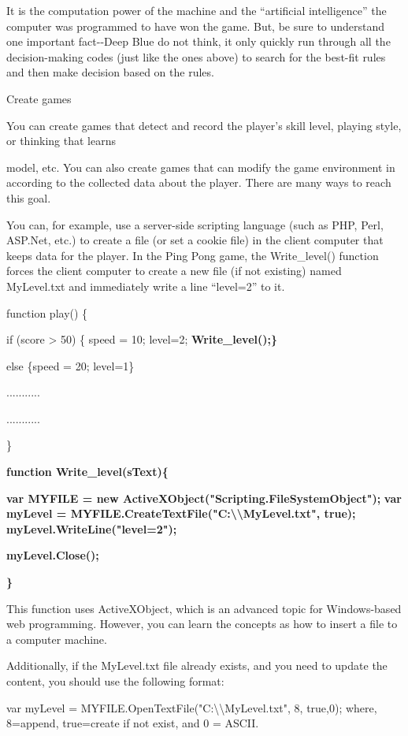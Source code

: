 \documentclass[
]{article}
\begin{document}
It is the computation power of the machine and the ``artificial
intelligence'' the computer was programmed to have won the game. But, be
sure to understand one important fact-\/-Deep Blue do not think, it only
quickly run through all the decision-making codes (just like the ones
above) to search for the best-fit rules and then make decision based on
the rules.

Create games

You can create games that detect and record the player's skill level,
playing style, or thinking that learns

model, etc. You can also create games that can modify the game
environment in according to the collected data about the player. There
are many ways to reach this goal.

You can, for example, use a server-side scripting language (such as PHP,
Perl, ASP.Net, etc.) to create a file (or set a cookie file) in the
client computer that keeps data for the player. In the Ping Pong game,
the Write\_level() function forces the client computer to create a new
file (if not existing) named MyLevel.txt and immediately write a line
``level=2'' to it.

function play() \{

if (score \textgreater{} 50) \{ speed = 10; level=2;
\textbf{Write\_level();\}}

else \{speed = 20; level=1\}

...........

...........

\}

\textbf{function Write\_level(sText)\{}

\textbf{var MYFILE = new ActiveXObject("Scripting.FileSystemObject");}
\textbf{var myLevel =
MYFILE.CreateTextFile("C:\textbackslash\textbackslash MyLevel.txt",
true);} \textbf{myLevel.WriteLine("level=2");}

\textbf{myLevel.Close();}

\textbf{\}}

This function uses ActiveXObject, which is an advanced topic for
Windows-based web programming. However, you can learn the concepts as
how to insert a file to a computer machine.

Additionally, if the MyLevel.txt file already exists, and you need to
update the content, you should use the following format:

var myLevel =
MYFILE.OpenTextFile("C:\textbackslash\textbackslash MyLevel.txt", 8,
true,0); where, 8=append, true=create if not exist, and 0 = ASCII.
\end{document}
